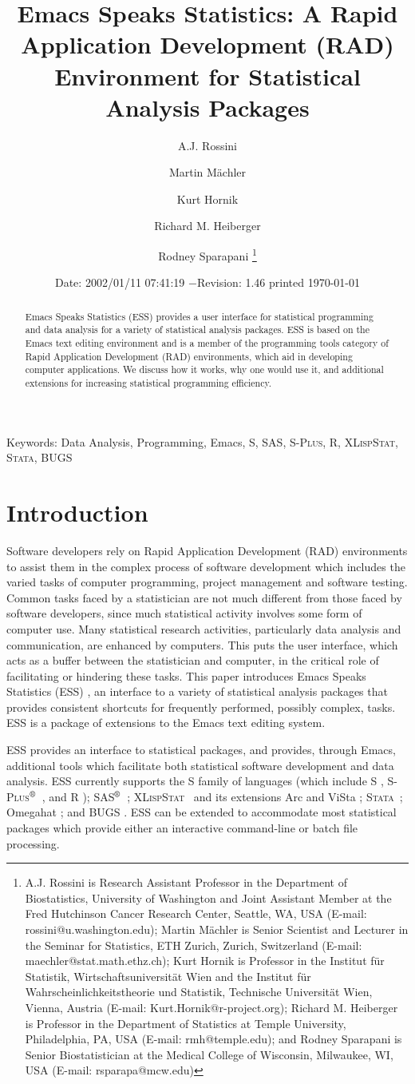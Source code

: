 \documentclass{article}
\title{Emacs Speaks Statistics:  A Rapid Application Development (RAD)
  Environment for Statistical Analysis Packages}
\author{A.J. Rossini \and Martin M{\"a}chler \and Kurt Hornik \and Richard
  M. Heiberger \and Rodney Sparapani \footnote{%
    A.J. Rossini is Research Assistant Professor in the Department of
    Biostatistics, University of Washington and Joint Assistant Member at
    the Fred Hutchinson Cancer Research Center, Seattle, WA, USA
    (E-mail: rossini@u.washington.edu);
    Martin M{\"a}chler is Senior Scientist and Lecturer in the Seminar for
    Statistics, ETH Zurich, Zurich, Switzerland
    (E-mail: maechler@stat.math.ethz.ch);
    Kurt Hornik is Professor in the Institut f{\"u}r Statistik,
    Wirtschaftsuniversit{\"a}t Wien and the Institut f{\"u}r
    Wahrscheinlichkeitstheorie und Statistik, Technische Universit{\"a}t
    Wien, Vienna, Austria (E-mail: Kurt.Hornik@r-project.org);
    Richard M. Heiberger is Professor in the Department of Statistics at
    Temple University, Philadelphia, PA, USA (E-mail: rmh@temple.edu);
    and Rodney Sparapani is Senior Biostatistician at the Medical College
    of Wisconsin, Milwaukee, WI, USA (E-mail: rsparapa@mcw.edu)}}
\date{$ $Date: 2002/01/11 07:41:19 $ - $Revision: 1.46 $ $\tiny printed \today}
\newif\ifdraft
\renewcommand{\baselinestretch}{1.5}
\newcommand*{\regstrd}{$^{\mbox{\scriptsize\textregistered}}$}
\newcommand*{\SAS}{\textsc{SAS}}
\newcommand*{\Splus}{\textsc{S-Plus}}
\newcommand*{\XLispStat}{\textsc{XLispStat}}
\newcommand*{\Stata}{\textsc{Stata}}
\begin{document}
\maketitle

\ifdraft{}%
\else%
 \renewcommand{\baselinestretch}{1.5}
\fi

\begin{abstract}
  Emacs Speaks Statistics (ESS) provides a user interface for
  statistical programming and data analysis for a variety
  of statistical analysis packages.  ESS
  is based on the Emacs text editing environment and is a member of
  the programming tools category of Rapid Application
  Development (RAD) environments, which aid in developing
  computer applications.  We discuss how it works, why one
  would use it, and additional extensions for increasing
  statistical programming efficiency.
\end{abstract}

\noindent Keywords: Data Analysis, Programming, Emacs, S, \SAS,
\Splus, R, \XLispStat, \Stata, BUGS


\section{Introduction}
\label{sec:introduction}

Software developers rely on Rapid Application Development (RAD)
environments to assist them in the complex process of software
development which includes the varied tasks of computer
programming, project management and software testing.
Common tasks faced by a statistician are not much different from those
faced by software developers, since much statistical
activity involves some form of computer use.  Many
statistical research activities, particularly data analysis and
communication, are enhanced by computers.  This puts the user
interface, which acts as a buffer between the statistician and
computer, in the critical role of facilitating or hindering these
tasks.  This paper introduces Emacs Speaks Statistics (ESS) \citep{ESS},
an interface to a variety of statistical analysis packages that
provides consistent shortcuts for frequently performed, possibly complex, tasks.
ESS is a package of extensions to the Emacs text editing system.

ESS provides an interface to statistical packages, and provides,
through Emacs, additional tools which facilitate both statistical
software development and data analysis.  ESS currently supports
the S family of languages (which include
S \citep{BecRCW88,ChaJH92,ChaJ98}, \Splus\regstrd\ \citep{Splus}, and R
\citep{ihak:gent:1996}); \SAS\regstrd\ \citep{SAS:8}; \XLispStat\
\citep{Tier90} and its extensions Arc \citep{Cook:Weisberg:1999} and
ViSta \citep{youn:fald:mcfa:1992}; \Stata\ \citep{Stata:6.0}; Omegahat
\citep{DTLang:2000}; and BUGS \citep{BUGS}.  ESS can be
extended to accommodate most statistical packages which provide either
an interactive command-line or batch file processing.
\end{document}
